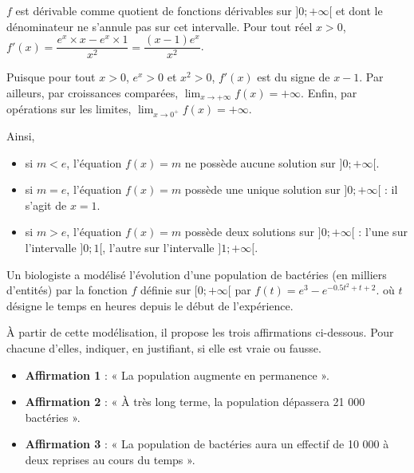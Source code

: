 \documentclass[11pt,fleqn, openany]{book} %
\begin{document}
\begin{solution}$f$ est dérivable comme quotient de fonctions dérivables sur $]0;+\infty[$ et dont le dénominateur ne s'annule pas sur cet intervalle. Pour tout réel $x>0$, $f'(x)=\dfrac{e^x \times x - e^x \times 1}{x^2}=\dfrac{(x-1)e^x}{x^2}$.

Puisque pour tout $x>0$, $e^x>0$ et $x^2>0$, $f'(x)$ est du signe de $x-1$. Par ailleurs, par croissances comparées, $\displaystyle\lim_{x\to +\infty}f(x)=+\infty$. Enfin, par opérations sur les limites, $\displaystyle\lim_{x\to 0^+}f(x)=+\infty$.

\begin{center}
\end{center}


Ainsi,
\begin{itemize}
\item si $m<e$, l'équation $f(x)=m$ ne possède aucune solution sur $]0;+\infty[$.
\item si $m=e$, l'équation $f(x)=m$ possède une unique solution sur $]0;+\infty[$ : il s'agit de $x=1$.
\item si $m>e$, l'équation $f(x)=m$ possède deux solutions sur $]0;+\infty[$ : l'une sur l'intervalle $]0;1[$, l'autre sur l'intervalle $]1;+\infty[$.
\end{itemize}
\end{solution}




\begin{exercise}[subtitle={(Centres étrangers 2023)}]
Un biologiste a modélisé l'évolution d'une population de bactéries (en milliers d'entités) par la fonction $f$ définie sur $[0;+\infty[$ par $f(t)=e^3-e^{-0.5t^2+t+2}$. où $t$ désigne le temps en heures depuis le début de l'expérience.

À partir de cette modélisation, il propose les trois affirmations ci-dessous. Pour chacune d'elles, indiquer, en justifiant, si elle est vraie ou fausse.
\begin{itemize}
\item \textbf{Affirmation 1} : « La population augmente en permanence ».
\item \textbf{Affirmation 2} : « À très long terme, la population dépassera 21 000 bactéries ».
\item \textbf{Affirmation 3} : « La population de bactéries aura un effectif de 10 000 à deux reprises au cours du temps ».\end{itemize}
\end{exercise}
\end{document}
